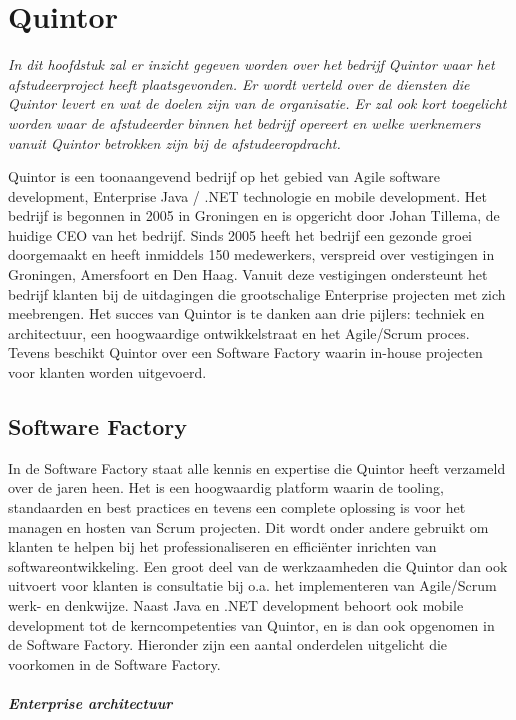 \chapter{Quintor}
\textit{In dit hoofdstuk zal er inzicht gegeven worden over het bedrijf Quintor waar het afstudeerproject heeft plaatsgevonden. Er wordt verteld over de diensten die Quintor levert en wat de doelen zijn van de organisatie. Er zal ook kort toegelicht worden waar de afstudeerder binnen het bedrijf opereert en welke werknemers vanuit Quintor betrokken zijn bij de afstudeeropdracht.
}

Quintor is een toonaangevend bedrijf op het gebied van Agile software development, Enterprise Java / .NET technologie en mobile development. Het bedrijf is begonnen in 2005 in Groningen en is opgericht door Johan Tillema, de huidige CEO van het bedrijf. Sinds 2005 heeft het bedrijf een gezonde groei doorgemaakt en heeft inmiddels 150 medewerkers, verspreid over vestigingen in Groningen, Amersfoort en Den Haag. Vanuit deze vestigingen ondersteunt het bedrijf klanten bij de uitdagingen die grootschalige Enterprise projecten met zich meebrengen. Het succes van Quintor is te danken aan drie pijlers: techniek en architectuur, een hoogwaardige ontwikkelstraat en het Agile/Scrum proces. Tevens beschikt Quintor over een Software Factory waarin in-house projecten voor klanten worden uitgevoerd.

\section{Software Factory}

In de Software Factory staat alle kennis en expertise die Quintor heeft verzameld over de jaren heen. Het is een hoogwaardig platform waarin de tooling, standaarden en best practices en tevens een complete oplossing is voor het managen en hosten van Scrum projecten. Dit wordt onder andere gebruikt om klanten te helpen bij het professionaliseren en efficiënter inrichten van softwareontwikkeling. Een groot deel van de werkzaamheden die Quintor dan ook uitvoert voor klanten is consultatie bij o.a. het implementeren van Agile/Scrum werk- en denkwijze. Naast Java en .NET development behoort ook mobile development tot de kerncompetenties van Quintor, en is dan ook opgenomen in de Software Factory. Hieronder zijn een aantal onderdelen uitgelicht die voorkomen in de Software Factory.

\paragraph{Enterprise architectuur}

